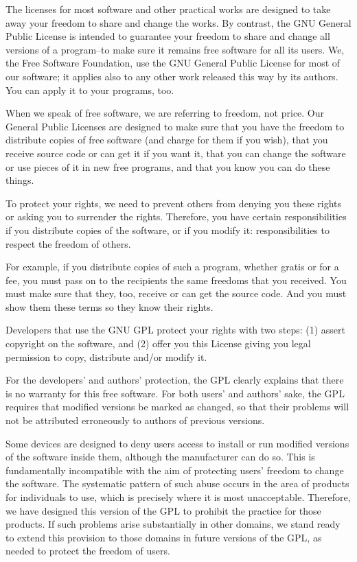 \documentclass[a4paper,10pt,DIV=15,openany]{scrbook}
\begin{document}
{\begin{shaded}
The licenses for most software and other practical works are designed
to take away your freedom to share and change the works.  By contrast,
the GNU General Public License is intended to guarantee your freedom to
share and change all versions of a program--to make sure it remains free
software for all its users.  We, the Free Software Foundation, use the
GNU General Public License for most of our software; it applies also to
any other work released this way by its authors.  You can apply it to
your programs, too.

When we speak of free software, we are referring to freedom, not
price.  Our General Public Licenses are designed to make sure that you
have the freedom to distribute copies of free software (and charge for
them if you wish), that you receive source code or can get it if you
want it, that you can change the software or use pieces of it in new
free programs, and that you know you can do these things.

To protect your rights, we need to prevent others from denying you
these rights or asking you to surrender the rights.  Therefore, you have
certain responsibilities if you distribute copies of the software, or if
you modify it: responsibilities to respect the freedom of others.

For example, if you distribute copies of such a program, whether
gratis or for a fee, you must pass on to the recipients the same
freedoms that you received.  You must make sure that they, too, receive
or can get the source code.  And you must show them these terms so they
know their rights.

Developers that use the GNU GPL protect your rights with two steps:
(1) assert copyright on the software, and (2) offer you this License
giving you legal permission to copy, distribute and/or modify it.

For the developers' and authors' protection, the GPL clearly explains
that there is no warranty for this free software.  For both users' and
authors' sake, the GPL requires that modified versions be marked as
changed, so that their problems will not be attributed erroneously to
authors of previous versions.

Some devices are designed to deny users access to install or run
modified versions of the software inside them, although the manufacturer
can do so.  This is fundamentally incompatible with the aim of
protecting users' freedom to change the software.  The systematic
pattern of such abuse occurs in the area of products for individuals to
use, which is precisely where it is most unacceptable.  Therefore, we
have designed this version of the GPL to prohibit the practice for those
products.  If such problems arise substantially in other domains, we
stand ready to extend this provision to those domains in future versions
of the GPL, as needed to protect the freedom of users.


\end{shaded}}
\end{document}
